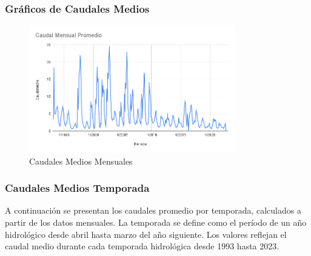 \documentclass{article} %
\begin{document}
\subsubsection{Gráficos de Caudales Medios}
\begin{figure}[h!]
    \centering
    \includegraphics[width=0.8\textwidth]{GRAFICOS/Caudal Mensual Promedio.png}
    \caption{Caudales Medios Mensuales}
    \label{fig:caudales_mensual}
\end{figure}

\newpage
\subsubsection{Caudales Medios Temporada}

A continuación se presentan los caudales promedio por temporada, calculados a partir de los datos mensuales. La temporada se define como el período de un año hidrológico desde abril hasta marzo del año siguiente. Los valores reflejan el caudal medio durante cada temporada hidrológica desde 1993 hasta 2023.
\end{document}
